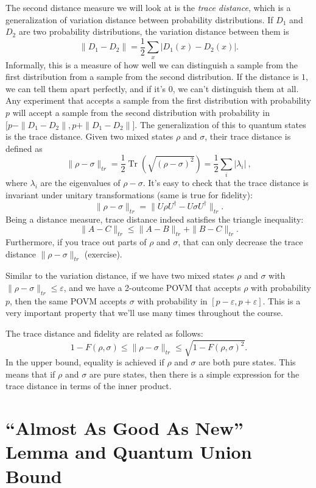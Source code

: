 \documentclass[11pt]{report}
\theoremstyle{plain}
\theoremstyle{definition}
\newcommand{\eps}{\varepsilon}
\newcommand{\Tr}{\operatorname{Tr}}
\begin{document}
The second distance measure we will look at is the \emph{trace distance}, which is a generalization of variation distance between probability distributions. If $D_1$ and $D_2$ are two probability distributions, the variation distance between them is
\[
\| D_1 - D_2 \| = \frac{1}{2} \sum_x |D_1(x) - D_2(x)|.
\]
Informally, this is a measure of how well we can distinguish a sample from the first distribution from a sample from the second distribution. If the distance is $1$, we can tell them apart perfectly, and if it's $0$, we can't distinguish them at all. Any experiment that accepts a sample from the first distribution with probability $p$ will accept a sample from the second distribution with probability in $\big[p - \|D_1 - D_2\|, p + \|D_1 - D_2\|\big]$. The generalization of this to quantum states is the trace distance. Given two mixed states $\rho$ and $\sigma$, their trace distance is defined as
\[
\| \rho - \sigma \|_{tr} = \frac12 \Tr\left( \sqrt{(\rho - \sigma)^2} \right) = \frac12 \sum_{i} |\lambda_i| \ ,
\]
where $\lambda_i$ are the eigenvalues of $\rho - \sigma$. It's easy to check that the trace distance is invariant under unitary transformations (same is true for fidelity):
\[
\| \rho - \sigma \|_{tr} = \| U \rho U^\dagger - U \sigma U^\dagger \|_{tr}.
\]
Being a distance measure, trace distance indeed satisfies the triangle inequality:
\[
\| A - C\|_{tr} \leq \|A - B\|_{tr} + \|B - C\|_{tr}.
\]
Furthermore, if you trace out parts of $\rho$ and $\sigma$, that can only decrease the trace distance $\| \rho - \sigma \|_{tr}$ (exercise).

Similar to the variation distance, if we have two mixed states $\rho$ and $\sigma$ with $\| \rho - \sigma \|_{tr} \leq \eps$, and we have a 2-outcome POVM that accepts $\rho$ with probability $p$, then the same POVM accepts $\sigma$ with probability in $[p-\eps, p+\eps]$. This is a very important property that we'll use many times throughout the course.

The trace distance and fidelity are related as follows:
\[
1 - F(\rho, \sigma) \leq \| \rho - \sigma \|_{tr} \leq \sqrt{1 - F(\rho, \sigma)^2}.
\]
In the upper bound, equality is achieved if $\rho$ and $\sigma$ are both pure states. This means that if $\rho$ and $\sigma$ are pure states, then there is a simple expression for the trace distance in terms of the inner product.


\section{``Almost As Good As New'' Lemma and Quantum Union Bound }
\end{document}

